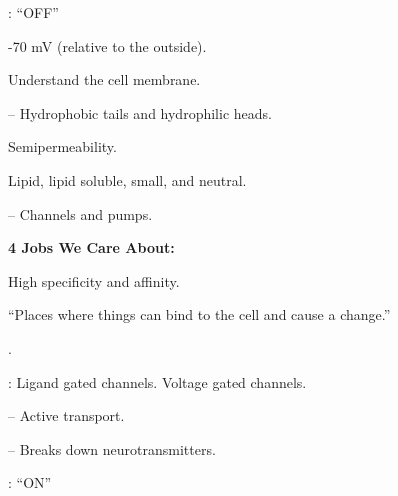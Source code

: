 \begin{coloredlist}
    \item {}: ``OFF'' 
    \begin{coloredlist}
        \item -70 mV (relative to the outside).
        \item Understand the cell membrane.
        \begin{coloredlist}
            \item {} -- Hydrophobic tails and hydrophilic heads.
            \item Semipermeability.
            \begin{coloredlist}
                \item Lipid, lipid soluble, small, and neutral.
            \end{coloredlist}
            \item {} -- Channels and pumps. 
            \begin{coloredlist}
                \item \textbf{4 Jobs We Care About:}
                \begin{coloredlist}
                    \item {}
                    \begin{coloredlist}
                        \item High specificity and affinity.
                        \item ``Places where things can bind to the cell and cause a change.''
                    \end{coloredlist}
                    \item {}.
                    \begin{coloredlist}
                        \item {}: Ligand gated channels. Voltage gated channels. 
                    \end{coloredlist}
                    \item {} -- Active transport.
                    \item {} -- Breaks down neurotransmitters.
                \end{coloredlist}
            \end{coloredlist}
        \end{coloredlist}
    \end{coloredlist}
    \item {}: ``ON''
\end{coloredlist}
